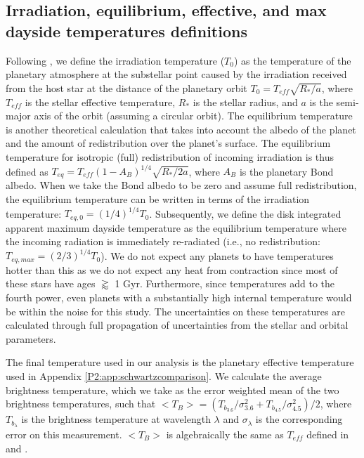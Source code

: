\subsection{Irradiation, equilibrium, effective, and max dayside temperatures definitions}
\label{P2:app:Temps}

Following \citet{Hansen2008}, we define the irradiation temperature ($T_0$) as the temperature of the planetary atmosphere at the  substellar point caused by the irradiation received from the host star at the distance of the planetary orbit $T_0 = T_{eff} \sqrt{R_*/a}$, where $T_{eff}$ is the stellar effective temperature, $R_*$ is the stellar radius, and $a$ is the semi-major axis of the orbit (assuming a circular orbit).
The equilibrium temperature is another theoretical calculation that takes into account the albedo of the planet and the amount of redistribution over the planet's surface. The equilibrium temperature for isotropic (full) redistribution of incoming irradiation is thus defined as $T_{eq} = T_{eff}(1-A_B)^{1/4} \sqrt{R_*/2a}$, where $A_B$ is the planetary Bond albedo. When we take the Bond albedo to be zero and assume full redistribution, the equilibrium temperature can be written in terms of the irradiation temperature: $T_{eq,\textit{0}} = (1/4)^{1/4} T_0$. Subsequently, we define the disk integrated apparent maximum dayside temperature \citep{Schwartz2017} as the equilibrium temperature where the incoming radiation is immediately re-radiated (i.e., no redistribution: $T_{eq,max} = (2/3)^{1/4} T_0$). We do not expect any planets to have temperatures hotter than this as we do not expect any heat from contraction since most of these stars have ages $\gtrapprox$ 1 Gyr. Furthermore, since temperatures add to the fourth power, even planets with a substantially high internal temperature \citep[e.g.,][]{Thorngren2019} would be within the noise for this study. The uncertainties on these temperatures are calculated through full propagation of uncertainties from the stellar and orbital parameters.

The final temperature used in our analysis is the planetary effective temperature used in Appendix \ref{P2:app:schwartzcomparison}. We calculate the average brightness temperature, which we take as the error weighted mean of the two brightness temperatures, such that $<T_B> = (T_{b_{3.6}}/ \sigma_{3.6}^2 +  T_{b_{4.5}}/\sigma_{4.5}^2) / 2 $, where $T_{b_{\lambda}}$ is the brightness temperature at wavelength $\lambda$ and $\sigma_{\lambda}$ is the corresponding error on this measurement. $<T_B>$ is algebraically the same as $T_{eff}$ defined in \citet{Schwartz2015} and \citet{Cowan2011b}.


